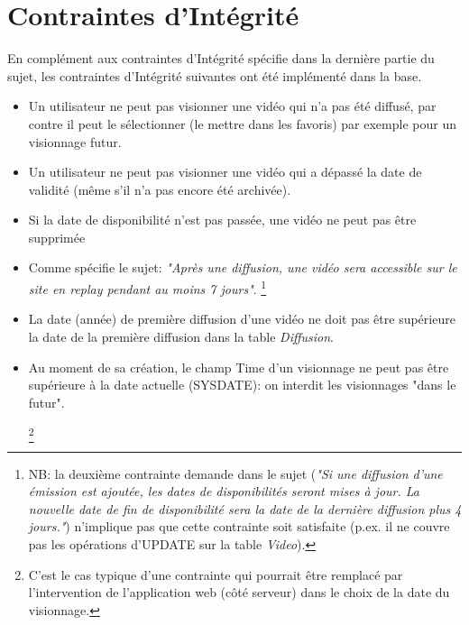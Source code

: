 \documentclass[twoside,openright,a4paper,11pt,french]{article}
\begin{document}
\newpage
\section{Contraintes d'Intégrité} En complément aux contraintes d'Intégrité
spécifie dans la dernière partie du sujet, les contraintes d'Intégrité
suivantes ont été implémenté dans la base.

\begin{itemize}
\item Un utilisateur ne peut pas visionner une vidéo qui n'a pas été diffusé,
par contre il peut le sélectionner (le mettre dans les favoris) par exemple
pour un visionnage futur.

\item Un utilisateur ne peut pas visionner une vidéo qui a dépassé la date de
validité (même s'il n'a pas encore été archivée).

\item Si la date de disponibilité n'est pas passée, une vidéo ne peut pas être supprimée

\item Comme spécifie le sujet: {\it "Après une diffusion, une vidéo sera
accessible sur le site en replay pendant au moins 7 jours"}.
\footnote{NB: la deuxième contrainte demande dans le sujet ({\it"Si une diffusion d’une émission est
ajoutée, les dates de disponibilités seront mises à jour.  La nouvelle date de
fin de disponibilité sera la date de la dernière diffusion plus 4 jours."})
n'implique pas que cette contrainte soit satisfaite (p.ex. il ne couvre pas les
opérations d'UPDATE sur la table {\it Video}).}

\item La date (année) de première diffusion d'une vidéo ne doit pas être
supérieure la date de la première diffusion dans la table {\it Diffusion}.

\item  Au moment de sa création, le champ Time d'un visionnage ne peut pas être
supérieure à la date actuelle (SYSDATE): on interdit les visionnages "dans le
futur".

\footnote{C'est le cas typique d'une contrainte qui pourrait être remplacé par
l'intervention de l'application web (côté serveur) dans le choix de la date du
visionnage.}

\end{itemize}

\end{document}
